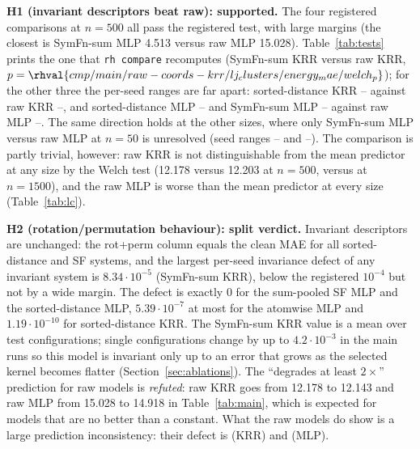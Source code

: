 \textbf{H1 (invariant descriptors beat raw): supported.} The four registered comparisons at $n{=}500$ all pass the registered test, with large margins (the closest is SymFn-sum MLP 4.513 versus raw MLP 15.028). Table~\ref{tab:tests} prints the one that \texttt{rh compare} recomputes (SymFn-sum KRR versus raw KRR, $p=\rhval{cmp/main/raw-coords-krr/lj_clusters/energy_mae/welch_p}$); for the other three the per-seed ranges are far apart: sorted-distance KRR -- against raw KRR --, and sorted-distance MLP -- and SymFn-sum MLP -- against raw MLP --. The same direction holds at the other sizes, where only SymFn-sum MLP versus raw MLP at $n{=}50$ is unresolved (seed ranges -- and --). The comparison is partly trivial, however: raw KRR is not distinguishable from the mean predictor at any size by the Welch test (12.178 versus 12.203 at $n{=}500$,  versus  at $n{=}1500$), and the raw MLP is worse than the mean predictor at every size (Table~\ref{tab:lc}).

\textbf{H2 (rotation/permutation behaviour): split verdict.} Invariant descriptors are unchanged: the rot+perm column equals the clean MAE for all sorted-distance and SF systems, and the largest per-seed invariance defect of any invariant system is $8.34\cdot10^{-5}$ (SymFn-sum KRR), below the registered $10^{-4}$ but not by a wide margin. The defect is exactly 0 for the sum-pooled SF MLP and the sorted-distance MLP, $5.39\cdot10^{-7}$ at most for the atomwise MLP and $1.19\cdot10^{-10}$ for sorted-distance KRR. The SymFn-sum KRR value is a mean over test configurations; single configurations change by up to $4.2\cdot10^{-3}$ in the main runs so this model is invariant only up to an error that grows as the selected kernel becomes flatter (Section~\ref{sec:ablations}). The ``degrades at least $2\times$'' prediction for raw models is \emph{refuted}: raw KRR goes from 12.178 to 12.143 and raw MLP from 15.028 to 14.918 in Table~\ref{tab:main}, which is expected for models that are no better than a constant. What the raw models do show is a large prediction inconsistency: their defect is  (KRR) and  (MLP).

